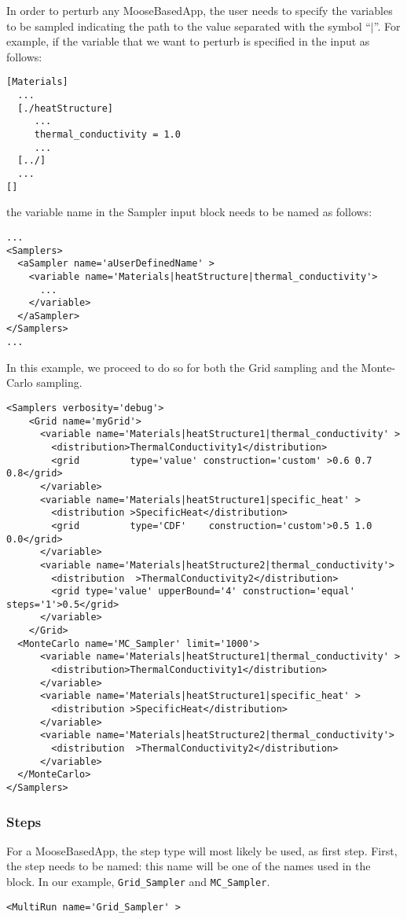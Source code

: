 In order to perturb any MooseBasedApp, the user needs to specify the variables to be
sampled indicating the path to the value separated with the symbol ``$|$''. For example,
if the variable that we want to perturb is specified in the input as follows:
\begin{lstlisting}[style=XML]
[Materials]
  ...
  [./heatStructure]
     ...
     thermal_conductivity = 1.0
     ...
  [../]
  ...
[]
\end{lstlisting}
the variable name in the Sampler input block needs to be named as follows:
\begin{lstlisting}[style=XML]
...
<Samplers>
  <aSampler name='aUserDefinedName' >
    <variable name='Materials|heatStructure|thermal_conductivity'>
      ...
    </variable>
  </aSampler>
</Samplers>
...
\end{lstlisting}
%
In this example, we proceed to do so for both the Grid sampling and the Monte-Carlo sampling.

\begin{lstlisting}[style=XML,morekeywords={name,type,construction,lowerBound,steps,limit,initialSeed}]
<Samplers verbosity='debug'>
    <Grid name='myGrid'>
      <variable name='Materials|heatStructure1|thermal_conductivity' >
        <distribution>ThermalConductivity1</distribution>
        <grid         type='value' construction='custom' >0.6 0.7 0.8</grid>
      </variable>
      <variable name='Materials|heatStructure1|specific_heat' >
        <distribution >SpecificHeat</distribution>
        <grid         type='CDF'    construction='custom'>0.5 1.0 0.0</grid>
      </variable>
      <variable name='Materials|heatStructure2|thermal_conductivity'>
        <distribution  >ThermalConductivity2</distribution>
        <grid type='value' upperBound='4' construction='equal' steps='1'>0.5</grid>
      </variable>
    </Grid>
  <MonteCarlo name='MC_Sampler' limit='1000'>
      <variable name='Materials|heatStructure1|thermal_conductivity' >
        <distribution>ThermalConductivity1</distribution>
      </variable>
      <variable name='Materials|heatStructure1|specific_heat' >
        <distribution >SpecificHeat</distribution>
      </variable>
      <variable name='Materials|heatStructure2|thermal_conductivity'>
        <distribution  >ThermalConductivity2</distribution>
      </variable>
  </MonteCarlo>
</Samplers>
\end{lstlisting}
\subsubsection{Steps}
For a MooseBasedApp, the  step type will most likely be
used, as first step.
%
First, the step needs to be named: this name will be one of the names used in
the  block.
%
In our example, \texttt{Grid\_Sampler} and \texttt{MC\_Sampler}.
%
\begin{lstlisting}[style=XML,morekeywords={name,debug,re-seeding}]
     <MultiRun name='Grid_Sampler' >
\end{lstlisting}

